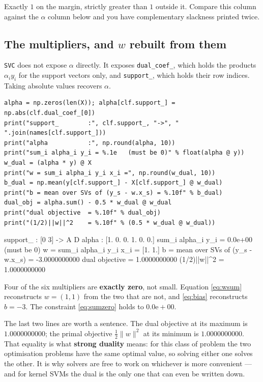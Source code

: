 \documentclass[11pt]{article}
\begin{document}
Exactly $1$ on the margin, strictly greater than $1$ outside it. Compare this
column against the $\alpha$ column below and you have complementary slackness
printed twice.

\subsection{The multipliers, and $w$ rebuilt from them}

\texttt{SVC} does not expose $\alpha$ directly. It exposes
\texttt{dual\_coef\_}, which holds the products $\alpha_i y_i$ for the support
vectors only, and \texttt{support\_}, which holds their row indices. Taking
absolute values recovers $\alpha$.

\begin{lstlisting}
alpha = np.zeros(len(X)); alpha[clf.support_] = np.abs(clf.dual_coef_[0])
print("support_        :", clf.support_, "->", " ".join(names[clf.support_]))
print("alpha           :", np.round(alpha, 10))
print("sum_i alpha_i y_i = %.1e   (must be 0)" % float(alpha @ y))
w_dual = (alpha * y) @ X
print("w = sum_i alpha_i y_i x_i =", np.round(w_dual, 10))
b_dual = np.mean(y[clf.support_] - X[clf.support_] @ w_dual)
print("b = mean over SVs of (y_s - w.x_s) = %.10f" % b_dual)
dual_obj = alpha.sum() - 0.5 * w_dual @ w_dual
print("dual objective  = %.10f" % dual_obj)
print("(1/2)||w||^2    = %.10f" % (0.5 * w_dual @ w_dual))
\end{lstlisting}
\begin{codeout}
support_        : [0 3] -> A D
alpha           : [1. 0. 0. 1. 0. 0.]
sum_i alpha_i y_i = 0.0e+00   (must be 0)
w = sum_i alpha_i y_i x_i = [1. 1.]
b = mean over SVs of (y_s - w.x_s) = -3.0000000000
dual objective  = 1.0000000000
(1/2)||w||^2    = 1.0000000000
\end{codeout}

Four of the six multipliers are \textbf{exactly zero}, not small. Equation
\eqref{eq:wsum} reconstructs $w = (1,1)$ from the two that are not, and
\eqref{eq:bias} reconstructs $b = -3$. The constraint \eqref{eq:sumzero} holds
to $0.0\mathrm{e}{+}00$.

The last two lines are worth a sentence. The dual objective at its maximum is
$1.0000000000$; the primal objective $\tfrac12\|w\|^2$ at its minimum is
$1.0000000000$. That equality is what \textbf{strong duality} means: for this
class of problem the two optimisation problems have the same optimal value, so
solving either one solves the other. It is why solvers are free to work on
whichever is more convenient --- and for kernel SVMs the dual is the only one
that can even be written down.
\end{document}
